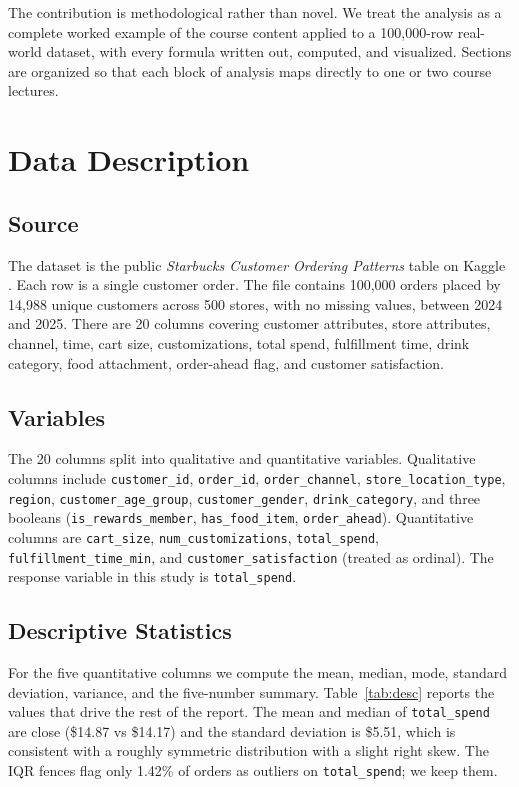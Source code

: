 \documentclass[conference,10pt]{IEEEtran}
\begin{document}
The contribution is methodological rather than novel. We treat the analysis as a complete worked example of the course content applied to a 100{,}000\nobreakdash-row real\nobreakdash-world dataset, with every formula written out, computed, and visualized. Sections are organized so that each block of analysis maps directly to one or two course lectures.

\section{Data Description}

\subsection{Source}
The dataset is the public \emph{Starbucks Customer Ordering Patterns} table on Kaggle \cite{kaggle}. Each row is a single customer order. The file contains 100{,}000 orders placed by 14{,}988 unique customers across 500 stores, with no missing values, between 2024 and 2025. There are 20 columns covering customer attributes, store attributes, channel, time, cart size, customizations, total spend, fulfillment time, drink category, food attachment, order\nobreakdash-ahead flag, and customer satisfaction.

\subsection{Variables}
The 20 columns split into qualitative and quantitative variables. Qualitative columns include \texttt{customer\_id}, \texttt{order\_id}, \texttt{order\_channel}, \texttt{store\_location\_type}, \texttt{region}, \texttt{customer\_age\_group}, \texttt{customer\_gender}, \texttt{drink\_category}, and three booleans (\texttt{is\_rewards\_member}, \texttt{has\_food\_item}, \texttt{order\_ahead}). Quantitative columns are \texttt{cart\_size}, \texttt{num\_customizations}, \texttt{total\_spend}, \texttt{fulfillment\_time\_min}, and \texttt{customer\_satisfaction} (treated as ordinal). The response variable in this study is \texttt{total\_spend}.

\subsection{Descriptive Statistics}
For the five quantitative columns we compute the mean, median, mode, standard deviation, variance, and the five\nobreakdash-number summary. Table~\ref{tab:desc} reports the values that drive the rest of the report. The mean and median of \texttt{total\_spend} are close (\$14.87 vs \$14.17) and the standard deviation is \$5.51, which is consistent with a roughly symmetric distribution with a slight right skew. The IQR fences flag only 1.42\% of orders as outliers on \texttt{total\_spend}; we keep them.
\end{document}
